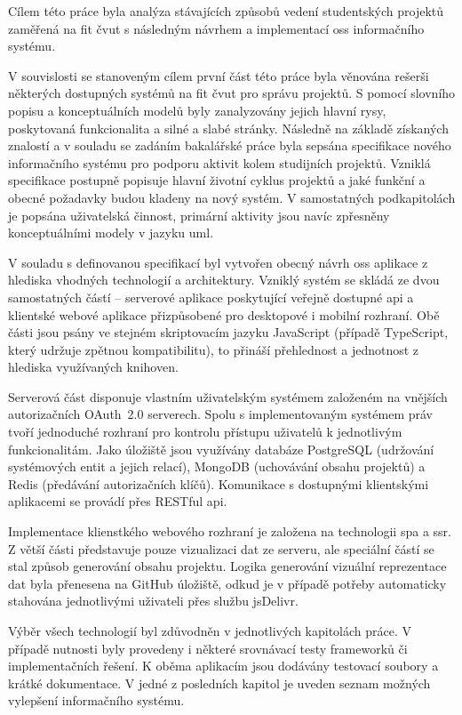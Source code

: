 Cílem této práce byla analýza stávajících způsobů vedení studentských projektů zaměřená na \gls{fit} \gls{čvut} s následným návrhem a implementací \gls{oss} informačního systému. 

V souvislosti se stanoveným cílem první část této práce byla věnována rešerši některých dostupných systémů na \gls{fit} \gls{čvut} pro správu projektů. S pomocí slovního popisu a konceptuálních modelů byly zanalyzovány jejich hlavní rysy, poskytovaná funkcionalita a silné a slabé stránky. Následně na základě získaných znalostí a v souladu se zadáním bakalářské práce byla sepsána specifikace nového informačního systému pro podporu aktivit kolem studijních projektů. Vzniklá specifikace postupně popisuje hlavní životní cyklus projektů a jaké funkční a obecné požadavky budou kladeny na nový systém. V samostatných podkapitolách je popsána uživatelská činnost, primární aktivity jsou navíc zpřesněny konceptuálními modely v jazyku \gls{uml}.

V souladu s definovanou specifikací byl vytvořen obecný návrh \gls{oss} aplikace z hlediska vhodných technologií a architektury. Vzniklý systém se skládá ze dvou samostatných částí -- serverové aplikace poskytující veřejně dostupné \gls{api} a klientské webové aplikace přizpůsobené pro desktopové i mobilní rozhraní. Obě části jsou psány ve stejném skriptovacím jazyku JavaScript (případě TypeScript, který udržuje zpětnou kompatibilitu), to přináší přehlednost a jednotnost z hlediska využívaných knihoven. 

Serverová část disponuje vlastním uživatelským systémem založeném na vnějších autorizačních OAuth~2.0 serverech. Spolu s implementovaným systémem práv tvoří jednoduché rozhraní pro kontrolu přístupu uživatelů k jednotlivým funkcionalitám. Jako úložiště jsou využívány databáze PostgreSQL (udržování systémových entit a jejich relací), MongoDB (uchovávání obsahu projektů) a Redis (předávání autorizačních klíčů). Komunikace s dostupnými klientskými aplikacemi se provádí přes RESTful \gls{api}.

Implementace klienstkého webového rozhraní je založena na technologii \gls{spa} a \gls{ssr}. Z větší části představuje pouze vizualizaci dat ze serveru, ale speciální částí se stal způsob generování obsahu projektu. Logika generování vizuální reprezentace dat byla přenesena na GitHub úložiště, odkud je v případě potřeby automaticky stahována jednotlivými uživateli přes službu jsDelivr. 

Výběr všech technologií byl zdůvodněn v jednotlivých kapitolách práce. V případě nutnosti byly provedeny i některé srovnávací testy frameworků či implementačních řešení. K oběma aplikacím jsou dodávány testovací soubory a krátké dokumentace. V jedné z posledních kapitol je uveden seznam možných vylepšení informačního systému.


